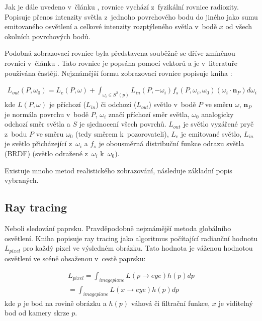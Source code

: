 Jak je dále uvedeno v~článku \cite{render_eq}, rovnice vychází z~fyzikální rovnice radiozity. Popisuje přenos intenzity světla z~jednoho povrchového bodu do jiného jako sumu emitovaného osvětlení a celkové intenzity rozptýleného světla v~bodě $x$ od všech okolních povrchových bodů.

Podobná zobrazovací rovnice byla představena souběžně se dříve zmíněnou rovnicí v~článku \cite{render_eq_2}. Tato rovnice je popsána pomocí vektorů a je v~literatuře používána častěji. Nejznámější formu zobrazovací rovnice popisuje kniha \cite{gfx_principles_practice}:

\begin{equation} \label{eq:render_2}
	\begin{gathered}
		L_{out}(P, \omega_0) = L_e(P, \omega) + \int_{\omega_i\in S^2(p)}L_{in}(P, -\omega_i)f_s(P, \omega_i, \omega_0)(\omega_i \cdot \textbf{n}_P)d\omega_i
	\end{gathered}
\end{equation}
kde $L(P, \omega)$ je příchozí ($L_{in}$) či odchozí ($L_{out}$) světlo v~bodě $P$ ve směru $\omega$, $\textbf{n}_P$ je normála povrchu v~bodě $P$, $\omega_i$ značí příchozí směr světla, $\omega_0$ analogicky odchozí směr světla a $S$ je sjednocení všech povrchů. $L_{out}$ je světlo vyzářené pryč z~bodu $P$ ve směru $\omega_0$ (tedy směrem k~pozorovateli), $L_e$ je emitované světlo, $L_{in}$ je světlo přicházející z~$\omega_i$ a $f_s$ je obousměrná distribuční funkce odrazu světla (BRDF) (světlo odražené z~$\omega_i$ k~$\omega_0$).

Existuje mnoho metod realistického zobrazování, následuje základní popis vybraných.

\subsection{Ray tracing}
Neboli sledování paprsku. Pravděpodobně nejznámější metoda globálního osvětlení. Kniha \cite{advanced_global} popisuje ray tracing jako algoritmus počítající radianční hodnotu $L_{pixel}$ pro každý pixel ve výsledném obrázku. Tato hodnota je váženou hodnotou osvětlení ve scéně obsaženou v~cestě paprsku:

\begin{equation} \label{eq:rt_1}
	\begin{gathered}
		L_{pixel} = \int_{imageplane}L(p \xrightarrow{} eye)h(p)dp \\= \int_{imageplane}L(x \xrightarrow{} eye)h(p)dp
	\end{gathered}
\end{equation}
kde $p$ je bod na rovině obrázku a $h(p)$ váhová či filtrační funkce, $x$ je viditelný bod od kamery skrze $p$.

